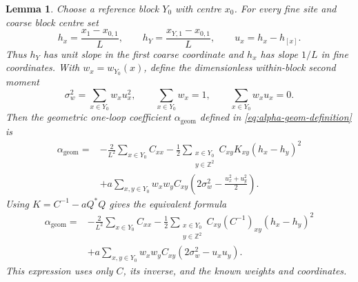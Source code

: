 \documentclass[11pt]{article}
\numberwithin{equation}{section}
\newtheorem{lemma}[theorem]{Lemma}
\theoremstyle{definition}
\theoremstyle{plain}
\begin{document}
\begin{lemma}
\label{lem:alpha-geometric}
Choose a reference block $Y_0$ with centre $x_0$.
For every fine site and coarse block centre set
\begin{equation}
 h_x=\frac{x_1-x_{0,1}}{L},\qquad
 h_Y=\frac{x_{Y,1}-x_{0,1}}{L},\qquad
 u_x=h_x-h_{[x]}.
 \label{eq:geom-affine-coordinates}
\end{equation}
Thus $h_Y$ has unit slope in the first coarse coordinate and
$h_x$ has slope $1/L$ in fine coordinates.  With $w_x=w_{Y_0}(x)$,
define the dimensionless within-block second moment
\begin{equation}
 \sigma_w^2=\sum_{x\in Y_0}w_xu_x^2,\qquad
 \sum_{x\in Y_0}w_x=1,\qquad
 \sum_{x\in Y_0}w_xu_x=0.
 \label{eq:geom-weight-moment}
\end{equation}
Then the geometric one-loop coefficient
$\alpha_{\mathrm{geom}}$ defined in
\eqref{eq:alpha-geom-definition} is
\begin{align}
 \alpha_{\mathrm{geom}}
 ={}&-\frac{2}{L^2}\sum_{x\in Y_0}C_{xx}
     -\frac12\sum_{\substack{x\in Y_0\\y\in\mathbb Z^2}}
            C_{xy}K_{xy}(h_x-h_y)^2 \nonumber\\
 &+a\sum_{x,y\in Y_0}w_xw_y C_{xy}
       \left(2\sigma_w^2-\frac{u_x^2+u_y^2}{2}\right).
 \label{eq:alpha-geom-kernel}
\end{align}
Using $K=C^{-1}-aQ^*Q$ gives the equivalent formula
\begin{align}
 \alpha_{\mathrm{geom}}
 ={}&-\frac{2}{L^2}\sum_{x\in Y_0}C_{xx}
     -\frac12\sum_{\substack{x\in Y_0\\y\in\mathbb Z^2}}
        C_{xy}(C^{-1})_{xy}(h_x-h_y)^2 \nonumber\\
 &+a\sum_{x,y\in Y_0}w_xw_y C_{xy}
                         (2\sigma_w^2-u_xu_y).
 \label{eq:alpha-geom-covariance}
\end{align}
This expression uses only $C$, its inverse, and the known weights and coordinates.
\end{lemma}
\end{document}
